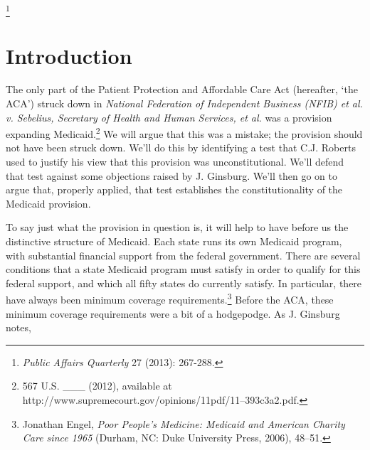 \footnote{\textit{Public Affairs Quarterly} 27 (2013): 267-288.}


\section{Introduction}
The only part of the Patient Protection and Affordable Care Act (hereafter, `the ACA') struck down in \emph{National Federation of Independent Business (NFIB) et al. v. Sebelius, Secretary of Health and Human Services, et al.} was a provision expanding Medicaid.\footnote{567 U.S. \_\_\_ (2012), available at http:/\slash www.supremecourt.gov\slash opinions\slash 11pdf\slash 11--393c3a2.pdf.} We will argue that this was a mistake; the provision should not have been struck down. We'll do this by identifying a test that C.J. Roberts used to justify his view that this provision was unconstitutional. We'll defend that test against some objections raised by J. Ginsburg. We'll then go on to argue that, properly applied, that test establishes the constitutionality of the Medicaid provision.

To say just what the provision in question is, it will help to have before us the distinctive structure of Medicaid. Each state runs its own Medicaid program, with substantial financial support from the federal government. There are several conditions that a state Medicaid program must satisfy in order to qualify for this federal support, and which all fifty states do currently satisfy. In particular, there have always been minimum coverage requirements.\footnote{Jonathan Engel, \emph{Poor People's Medicine: Medicaid and American Charity Care since 1965} (Durham, NC: Duke University Press, 2006), 48--51.} Before the ACA, these minimum coverage requirements were a bit of a hodgepodge. As J. Ginsburg notes,

